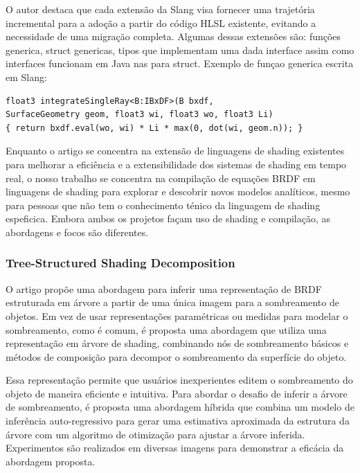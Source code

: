 \documentclass[english, 
               brazil, 
               bsc] %
               {dcomp-abntex2}
\begin{document}
O autor destaca que cada extensão da Slang visa fornecer uma trajetória incremental para a adoção a partir do código HLSL existente, evitando a necessidade de uma migração completa. Algumas dessas extensões são: funções generica, struct genericas, tipos que implementam uma dada interface assim como interfaces funcionam em Java nas para struct.
Exemplo de funçao generica escrita em Slang:

\begin{verbatim}
float3 integrateSingleRay<B:IBxDF>(B bxdf,
SurfaceGeometry geom, float3 wi, float3 wo, float3 Li)
{ return bxdf.eval(wo, wi) * Li * max(0, dot(wi, geom.n)); }

\end{verbatim}


Enquanto o artigo se concentra na extensão de linguagens de shading existentes para melhorar a eficiência e a extensibilidade dos sistemas de shading em tempo real, o nosso trabalho se concentra na compilação de equações BRDF em linguagens de shading para explorar e descobrir novos modelos analíticos, mesmo para pessoas que não tem o conhecimento ténico da linguagem de shading espeficica. Embora ambos os projetos façam uso de shading e compilação, as abordagens e focos são diferentes.

\subsubsection{Tree-Structured Shading Decomposition}

O artigo propõe uma abordagem para inferir uma representação de BRDF estruturada em árvore a partir de uma única imagem para a sombreamento de objetos. Em vez de usar representações paramétricas ou medidas para modelar o sombreamento, como é comum, é proposta uma abordagem que utiliza uma representação em árvore de shading, combinando nós de sombreamento básicos e métodos de composição para decompor o sombreamento da superfície do objeto.

Essa representação permite que usuários inexperientes editem o sombreamento do objeto de maneira eficiente e intuitiva. Para abordar o desafio de inferir a árvore de sombreamento, é proposta uma abordagem híbrida que combina um modelo de inferência auto-regressivo para gerar uma estimativa aproximada da estrutura da árvore com um algoritmo de otimização para ajustar a árvore inferida. Experimentos são realizados em diversas imagens para demonstrar a eficácia da abordagem proposta.
\end{document}
